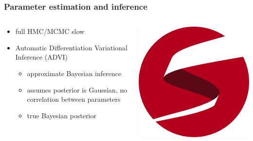 \documentclass{beamer}
\begin{document}
\begin{frame}
  \frametitle{Parameter estimation and inference}

  \begin{columns}
    \begin{column}{0.45\textwidth}
      \begin{itemize}
        \item full HMC/MCMC slow
        \item Automatic Differentiation Variational Inference (ADVI) 
          \begin{itemize}
            \item approximate Bayesian inference
            \item assumes posterior is Gaussian, no correlation between parameters
            \item true Bayesian posterior
          \end{itemize}
      \end{itemize}
    \end{column}
    \begin{column}{0.55\textwidth}
      \includegraphics[height=0.9\textheight,width=\textwidth,keepaspectratio=true]{figure/stan_logo}
    \end{column}
  \end{columns}
\end{frame}
\end{document}
